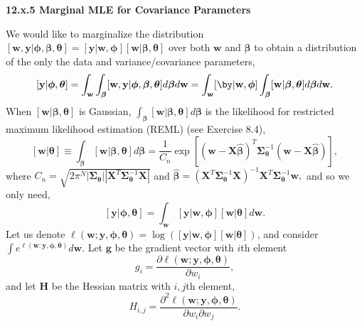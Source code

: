 \documentclass[12pt, titlepage]{article}
\begin{document}
\vspace{.5cm}
{\large \flushleft \textbf{12.x.5 Marginal MLE for Covariance Parameters}}
\vspace{.5cm}

We would like to marginalize the distribution $[\mathbf{w}, \mathbf{y}|\boldsymbol{\phi},\boldsymbol{\beta},\boldsymbol{\theta}] = [\mathbf{y}|\mathbf{w},\boldsymbol{\phi}][\mathbf{w}|\boldsymbol{\beta},\boldsymbol{\theta}]$ over both $\mathbf{w}$ and $\boldsymbol{\beta}$ to obtain a distribution of the only the data and variance/covariance parameters,
$$
	[\mathbf{y}|\boldsymbol{\phi},\boldsymbol{\theta}] = \int_\mathbf{w} \int_{\boldsymbol{\beta}} [\mathbf{w}, \mathbf{y}|\boldsymbol{\phi},\boldsymbol{\beta},\boldsymbol{\theta}] d\boldsymbol{\beta} d\mathbf{w} =
		\int_\mathbf{w}  [\by|\mathbf{w},\boldsymbol{\phi}] \int_{\boldsymbol{\beta}} [\mathbf{w}|\boldsymbol{\beta},\boldsymbol{\theta}] d\boldsymbol{\beta} d\mathbf{w}.
$$
When $[\mathbf{w}|\boldsymbol{\beta},\boldsymbol{\theta}]$ is Gaussian, $\int_{\boldsymbol{\beta}} [\mathbf{w}|\boldsymbol{\beta},\boldsymbol{\theta}] d\boldsymbol{\beta}$ is the likelihood for restricted maximum likelihood estimation (REML) (see Exercise 8.4),
$$
[\mathbf{w}|\boldsymbol{\theta}] \equiv \int_{\boldsymbol{\beta}} [\mathbf{w}|\boldsymbol{\beta},\boldsymbol{\theta}] d\boldsymbol{\beta} = 
\frac{1}{C_n}\exp[(\mathbf{w} - \mathbf{X}\hat{\boldsymbol{\beta}})^{T}\boldsymbol{\Sigma}_{\boldsymbol{\theta}}^{-1}(\mathbf{w} - \mathbf{X}\hat{\boldsymbol{\beta}})],
$$
where $C_n = \sqrt{2\pi^N|\boldsymbol{\Sigma}_{\boldsymbol{\theta}}||\mathbf{X}^{T}\boldsymbol{\Sigma}_{\boldsymbol{\theta}}^{-1}\mathbf{X}|}$ and 
$\hat{\boldsymbol{\beta}} = (\mathbf{X}^{T}\boldsymbol{\Sigma}_{\boldsymbol{\theta}}^{-1}\mathbf{X})^{-1}\mathbf{X}^{T}\boldsymbol{\Sigma}_{\boldsymbol{\theta}}^{-1}\mathbf{w},$
and so we only need,
$$
	[\mathbf{y}| \boldsymbol{\phi},\boldsymbol{\theta}] = \int_\mathbf{w}  [\mathbf{y}|\mathbf{w},\boldsymbol{\phi}][\mathbf{w}|\boldsymbol{\theta}]d\mathbf{w}.
$$
Let us denote $\ell(\mathbf{w};\mathbf{y},\boldsymbol{\phi},\boldsymbol{\theta}) = \log([\mathbf{y}|\mathbf{w},\boldsymbol{\phi}][\mathbf{w}|\boldsymbol{\theta}])$, and consider $\int e^{\ell(\mathbf{w};\mathbf{y},\boldsymbol{\phi},\boldsymbol{\theta})} d\mathbf{w}$. Let $\mathbf{g}$ be the gradient vector with $i$th element
$$
g_{i} = \frac{\partial \ell(\mathbf{w};\mathbf{y},\boldsymbol{\phi},\boldsymbol{\theta})}{\partial w_i},
$$
and let $\mathbf{H}$ be the Hessian matrix with $i,j$th element,
$$
H_{i,j} = \frac{\partial^2 \ell(\mathbf{w};\mathbf{y},\boldsymbol{\phi},\boldsymbol{\theta})}{\partial w_i\partial w_j}.
$$
\end{document}
